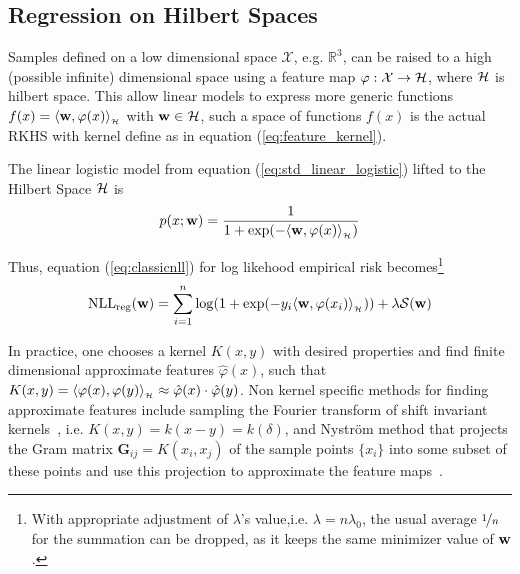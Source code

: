 \subsection{Regression on Hilbert Spaces}
\label{ss:reg_hs}
Samples defined on a low dimensional space $\mathcal{X}$, e.g. $\mathbb{R}^3$,
can be raised to a high (possible infinite) dimensional space using a feature
map $\varphi:\mathcal{X}\to\mathcal{H}$, where $\mathcal{H}$ is hilbert space. This allow
linear models to express more generic functions $f(x) =
\langle \mathrm{\mathbf{w}},\varphi(x)\rangle_{_{\mathcal{H}}}$ with $\mathrm{\mathbf{w}}\in\mathcal{H}$, such a space of functions
$f(x)$ is the actual RKHS with kernel define as in equation
(\ref{eq:feature_kernel}).

The linear logistic model from equation (\ref{eq:std_linear_logistic}) lifted to
the Hilbert Space $\mathcal{H}$ is
\begin{equation}
\label{eq:hslogistic}
p(x;\mathrm{\mathbf{w}}) = \frac{1}{1+\exp(-\langle \mathrm{\mathbf{w}},\varphi(x)\rangle_{_{\mathcal{H}}})}
\end{equation}

Thus, equation (\ref{eq:classicnll}) for log likehood empirical risk
becomes\footnote{With appropriate adjustment of $\lambda$'s value,i.e.
$\lambda=n\lambda_0$, the usual average $\nicefrac{1}{n}$ for the summation can
be dropped, as it keeps the same minimizer value of $\mathrm{\mathbf{w}}$.}
\begin{equation}
\label{eq:hsnll}
\text{NLL}_{\text{reg}}(\mathrm{\mathbf{w}}) =  \sum_{i=1}^n \log(1+\exp(-y_i
\langle \mathrm{\mathbf{w}},\varphi(x_i)\rangle_{_{\mathcal{H}}})) +\lambda\mathcal{S}(\mathrm{\mathbf{w}})
\end{equation}

In practice, one chooses a kernel $K(x,y)$ with desired properties and
find finite dimensional approximate features $\hat\varphi(x)$, such that
$K(x,y)=\langle \varphi(x),\varphi(y)\rangle_{_{\mathcal{H}}}\approx\hat\varphi(x)\cdot\hat\varphi(y)$.
Non kernel specific methods for finding approximate features include sampling
the Fourier transform of shift invariant kernels~\cite{rahimi2007random}, i.e.
$K(x,y)=k(x-y)=k(\delta)$, and Nystr\"om method that projects the Gram matrix
$\mathbf{G}_{ij}=K(x_i,x_j)$ of the sample points $\{x_i\}$ into some subset of
these points and use this projection to approximate the feature
maps~\cite{williams2000using}.
